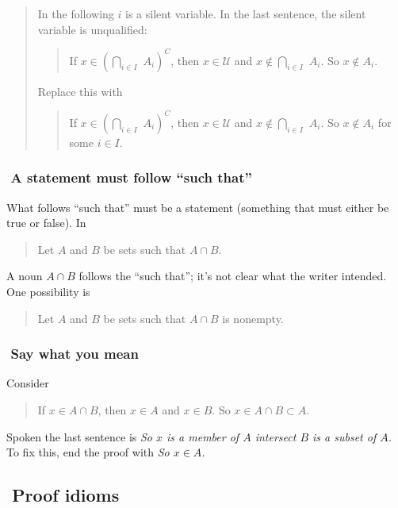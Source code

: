 \documentclass[12pt,fleqn]{article}
\newcounter{ex}\setcounter{ex}{0}
\newcommand{\ex}{%
\hspace{-0.2in} \setcounter{ex}{\value{ex}+1}
\theex \,\,}
\newcounter{id}\setcounter{id}{0}
\newcounter{se}\setcounter{se}{0}
\newcommand{\se}{%
\hspace{-0.2in} \setcounter{se}{\value{se}+1}
\these \,\,}
\begin{document}
\begin{quote}
In the following \(i\) is a  silent variable. In the last sentence, the
 silent variable is unqualified:
\begin{quote}
If \(x \in \left(\underset{i \in I}{\bigcap} \,\, A_i \right)^C\), then
\(x \in \mathcal{U}\) and \(x \notin \underset{i \in I}{\bigcap} \,\, A_i\).
So \(x \notin A_i\).
\end{quote}
Replace this with
\begin{quote}
If \(x \in \left(\underset{i \in I}{\bigcap} \,\, A_i \right)^C\), then
\(x \in \mathcal{U}\) and \(x \notin \underset{i \in I}{\bigcap} \,\, A_i\).
So \(x \notin A_i\) for some \(i \in I\).
\end{quote}
\end{quote}

\subsubsection*{\ex A statement must follow ``such that'' }

What follows ``such that'' must be a statement (something that must either
be true or false).  In 

\begin{quote}
Let \(A\) and \(B\) be sets such that \(A \cap B\).
\end{quote}
A noun \(A \cap B\) follows the ``such that''; it's not clear what the writer intended.
One possibility is 
\begin{quote}
Let \(A\) and \(B\) be sets such that \(A \cap B\) is nonempty.
\end{quote}

\subsubsection*{\ex Say what you mean }

Consider
\begin{quote}
If \(x \in A \cap B\), then \(x \in A\) and \(x \in B\). So
\(x \in A \cap B \subset A\).
\end{quote}
Spoken the last sentence is 
 \emph{So \(x\) is a member of \(A\) intersect \(B\) is a subset of \(A\).} To fix this,
end the proof with \emph{So \(x \in A\).}









\subsection*{\se Proof idioms}
\end{document}
